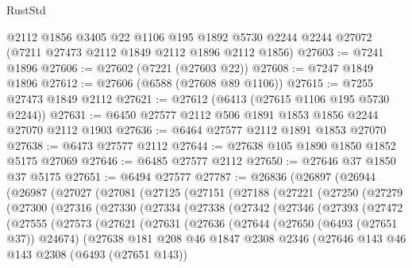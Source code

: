 \begin{lexlean}{RustStd}
\begin{coremodule}
    @2112
    @1856
    @3405
    @22
    @1106
    @195
    @1892
    @5730
    @2244
    @2244
    @27072
    (@7211 @27473 @2112 @1849 @2112 @1896 @2112 @1856)
@27603 := @7241 @1896
@27606 := @27602 (@7221 (@27603 @22))
@27608 := @7247 @1849 @1896
@27612 := @27606 (@6588 (@27608 @89 @1106))
@27615 := @7255 @27473 @1849 @2112
@27621 := @27612 (@6413 (@27615 @1106 @195 @5730 @2244))
@27631 := @6450 @27577 @2112 @506 @1891 @1853 @1856 @2244 @27070 @2112 @1903
@27636 := @6464 @27577 @2112 @1891 @1853 @27070
@27638 := @6473 @27577 @2112
@27644 := @27638 @105 @1890 @1850 @1852 @5175 @27069
@27646 := @6485 @27577 @2112
@27650 := @27646 @37 @1850 @37 @5175
@27651 := @6494 @27577
@27787 := @26836
    (@26897
      (@26944
        (@26987
          (@27027
            (@27081
              (@27125
                (@27151
                  (@27188
                    (@27221
                      (@27250
                        (@27279
                          (@27300
                            (@27316
                              (@27330
                                (@27334
                                  (@27338
                                    (@27342
                                      (@27346
                                        (@27393
                                          (@27472
                                            (@27555
                                              (@27573
                                                (@27621
                                                  (@27631
                                                    (@27636
                                                      (@27644
                                                        (@27650 (@6493 (@27651 @37)) @24674)
                                                        (@27638
                                                          @181
                                                          @208
                                                          @46
                                                          @1847
                                                          @2308
                                                          @2346
                                                          (@27646
                                                            @143
                                                            @46
                                                            @143
                                                            @2308
                                                            (@6493 (@27651 @143))

\end{coremodule}
\end{lexlean}
